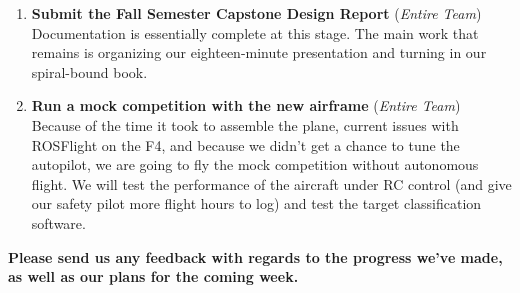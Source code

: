 \documentclass[]{../auvsi_doc}
\begin{document}
\begin{enumerate}
\item \textbf{Submit the Fall Semester Capstone Design Report} (\textit{Entire Team}) \\
Documentation is essentially complete at this stage. The main work that remains is organizing our eighteen-minute presentation and turning in our spiral-bound book.
\item \textbf{Run a mock competition with the new airframe} (\textit{Entire Team}) \\
Because of the time it took to assemble the plane, current issues with ROSFlight on the F4, and because we didn't get a chance to tune the autopilot, we are going to fly the mock competition without autonomous flight. We will test the performance of the aircraft under RC control (and give our safety pilot more flight hours to log) and test the target classification software.
\end{enumerate}
\textbf{Please send us any feedback with regards to the progress we've made, as well as our plans for the coming week.}
\end{document}
